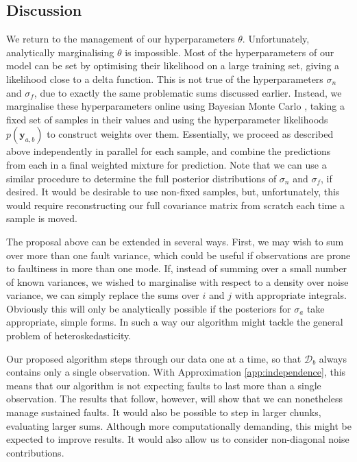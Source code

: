 \documentclass{article} %
\newcommand{\cm}[1]{\ensuremath{\mathcal{#1}}}
\newcommand{\bm}[1]{\ensuremath{\mathbf{#1}}}
\newcommand{\data}{\ensuremath{\cm{D}}}
\newcommand{\vect}[1]{\bm{#1}}
\newcommand{\vy}{\vect{y}}
\begin{document}
\subsection{Discussion}

We return to the management of our hyperparameters
$\theta$. Unfortunately, analytically marginalising $\theta$ is
impossible. Most of the hyperparameters of our model can be set by
optimising their likelihood on a large training set, giving a
likelihood close to a delta function. This is not true of the
hyperparameters $\sigma_n$ and $\sigma_f$, due to exactly the same
problematic sums discussed earlier. Instead, we marginalise these
hyperparameters online using Bayesian Monte Carlo \citep[Chapter
  7]{osbornebayesian}, taking a fixed set of samples in their values
and using the hyperparameter likelihoods $p(\vy_{a,b})$ to construct
weights over them. Essentially, we proceed as described above
independently in parallel for each sample, and combine the predictions
from each in a final weighted mixture for prediction. Note that we can
use a similar procedure \citep{garnettosborne} to determine the full
posterior distributions of $\sigma_n$ and $\sigma_f$, if desired.  It
would be desirable to use non-fixed samples, but, unfortunately, this
would require reconstructing our full covariance matrix from
scratch each time a sample is moved.

The proposal above can be extended in several ways. First, we may wish
to sum over more than one fault variance, which could be useful if
observations are prone to faultiness in more than one mode.  If, instead of summing over a small number of known variances, we
wished to marginalise with respect to a density over noise variance,
we can simply replace the sums over $i$ and $j$ with appropriate
integrals. Obviously this will only be analytically possible if the
posteriors for $\sigma_a$ take appropriate, simple forms.  In such a way our algorithm might tackle the general problem of
heteroskedasticity.


Our proposed algorithm steps through our data one at a time, so that
$\data_b$ always contains only a single observation. With Approximation \ref{app:independence}, this means that our algorithm is not expecting faults to last more than a single observation. The results that follow, however, will show that we can nonetheless manage sustained faults. It would also
be possible to step in larger chunks, evaluating larger
sums. Although more computationally demanding, this might be expected
to improve results. It would also allow us to consider non-diagonal
noise contributions.
\end{document}
